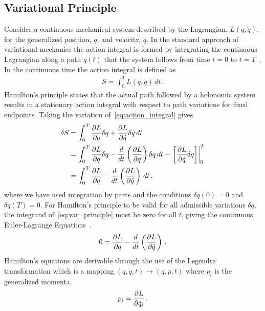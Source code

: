 \documentclass[letterpaper, paper,11pt]{AAS}		%
\begin{document}
\subsection{Variational Principle}
Consider a continuous mechanical system described by the Lagrangian, \( L( q, \dot{q} ) \), for the generalized position, \( q\), and velocity, \( \dot{q} \).
In the standard approach of variational mechanics the action integral is formed by integrating the continuous Lagrangian along a path \( q(t) \) that the system follows from time \( t = 0 \) to \( t = T \)~\cite{greenwood1988}.
In the continuous time the action integral is defined as
\begin{align}\label{eq:action_integral}
	S = \int_{0}^T L\left( q, \dot{q}\right) \, dt \, .
\end{align}
Hamilton's principle states that the actual path followed by a holonomic system results in a stationary action integral with respect to path variations for fixed endpoints.
Taking the variation of~\cref{eq:action_integral} gives
\begin{subequations}\label{eq:var_principle}
\begin{align}
	\delta S &= \int_{0}^T \frac{\partial L}{\partial q} \delta q + \frac{\partial L}{\partial \dot{q}} \delta \dot{q} \, dt \\
		&= \int_{0}^T \frac{\partial L}{\partial q} \delta q - \frac{d}{dt} \left( \frac{\partial L}{\partial \dot{q}}\right) \delta q \, dt - \left. \left[ \frac{\partial L}{\partial \dot{q}} \delta q\right] \right|_0^T \\
	&= \int_{0}^T \frac{\partial L}{\partial q} - \frac{d}{dt} \left( \frac{\partial L}{\partial \dot{q}}	\right) \, dt \, ,
\end{align}
\end{subequations} 
where we have used integration by parts and the conditions \( \delta q(0) = 0 \) and \( \delta q(T) = 0\).
For Hamilton's principle to be valid for all admissible variations \( \delta q \), the integrand of~\cref{eq:var_principle} must be zero for all \( t\), giving the continuous Euler-Lagrange Equations~\cite{lanczos1970}.
\begin{align}\label{eq:euler-lagrange}
	0 = \deriv{L}{q} - \frac{d}{dt} \left( \deriv{L}{\dot{q}} \right) \, .
\end{align}
Hamilton's equations are derivable through the use of the Legendre transformation which is a mapping \( \left( q, \dot{q},t\right) \rightarrow \left(q, p, t \right) \) where \( p_i\) is the generalized momenta.
\begin{align}\label{eq:legendre_transform}
	p_i = \deriv{L}{\dot{q}_i} \, .
\end{align}
\end{document}
